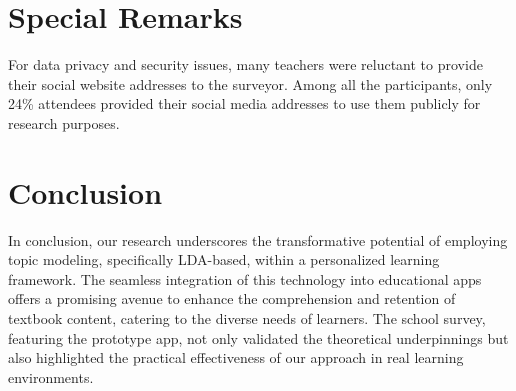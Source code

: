 \documentclass[sn-mathphys,Numbered]{sn-jnl}%
\theoremstyle{thmstyleone}%
\theoremstyle{thmstyletwo}%
\theoremstyle{thmstylethree}%
\begin{document}

\section{Special Remarks}

For data privacy and security issues, many teachers were reluctant to provide their social website addresses to the surveyor. Among all the participants, only 24\% attendees provided their social media addresses to use them publicly for research purposes.\\


\section{Conclusion}\label{conclu}

In conclusion, our research underscores the transformative potential of employing topic modeling, specifically LDA-based, within a personalized learning framework. The seamless integration of this technology into educational apps offers a promising avenue to enhance the comprehension and retention of textbook content, catering to the diverse needs of learners. The school survey, featuring the prototype app, not only validated the theoretical underpinnings but also highlighted the practical effectiveness of our approach in real learning environments.
\end{document}
